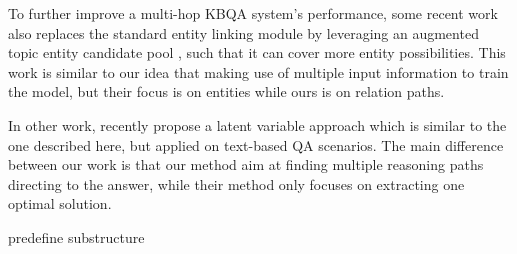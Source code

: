  To further improve a multi-hop KBQA system's performance, some recent work also replaces the standard entity linking module by leveraging an augmented topic entity candidate pool \cite{DBLP:conf/ijcai/LanW019}, such that it can cover more entity possibilities. This work is similar to our idea that making use of multiple input information to train the model, but their focus is on entities while ours is on relation paths.



In other work,  recently propose a latent variable approach which is similar to the one described here, but applied on text-based QA scenarios. The main difference between our work is that our method aim at finding multiple reasoning paths directing to the answer, while their method only focuses on extracting one optimal solution.

\cite{DBLP:journals/corr/abs-1908-11053} predefine substructure